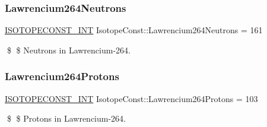 \subsubsection{\texorpdfstring{Lawrencium264\+Neutrons}{Lawrencium264Neutrons}}
{\footnotesize\ttfamily \mbox{\hyperlink{group___isotope_const-_macros_ga5f18360b3e99483a35c32d789e62621c}{I\+S\+O\+T\+O\+P\+E\+C\+O\+N\+S\+T\+\_\+\+I\+NT}} Isotope\+Const\+::\+Lawrencium264\+Neutrons = 161}

\$ \$ Neutrons in Lawrencium-\/264. \mbox{\label{group___isotope_const-_lawrencium-_lr264_gade40ccfe2eb1496b27e4e0b6014d2dc7}} 
\subsubsection{\texorpdfstring{Lawrencium264\+Protons}{Lawrencium264Protons}}
{\footnotesize\ttfamily \mbox{\hyperlink{group___isotope_const-_macros_ga5f18360b3e99483a35c32d789e62621c}{I\+S\+O\+T\+O\+P\+E\+C\+O\+N\+S\+T\+\_\+\+I\+NT}} Isotope\+Const\+::\+Lawrencium264\+Protons = 103}

\$ \$ Protons in Lawrencium-\/264. 